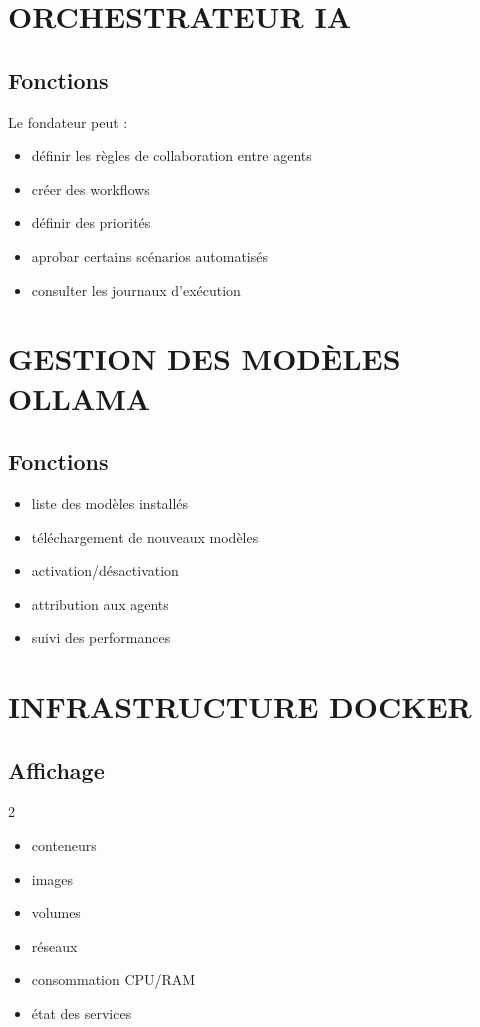 \documentclass[12pt,a4paper,oneside]{book}
\begin{document}
\chapter{ORCHESTRATEUR IA}

\section{Fonctions}
Le fondateur peut :
\begin{itemize}
\item définir les règles de collaboration entre agents
\item créer des workflows
\item définir des priorités
\item aprobar certains scénarios automatisés
\item consulter les journaux d'exécution
\end{itemize}

\chapter{GESTION DES MODÈLES OLLAMA}

\section{Fonctions}
\begin{itemize}
\item liste des modèles installés
\item téléchargement de nouveaux modèles
\item activation/désactivation
\item attribution aux agents
\item suivi des performances
\end{itemize}

\chapter{INFRASTRUCTURE DOCKER}

\section{Affichage}
\begin{multicols}{2}
\begin{itemize}
\item conteneurs
\item images
\item volumes
\item réseaux
\item consommation CPU/RAM
\item état des services
\end{itemize}
\end{multicols}
\end{document}

